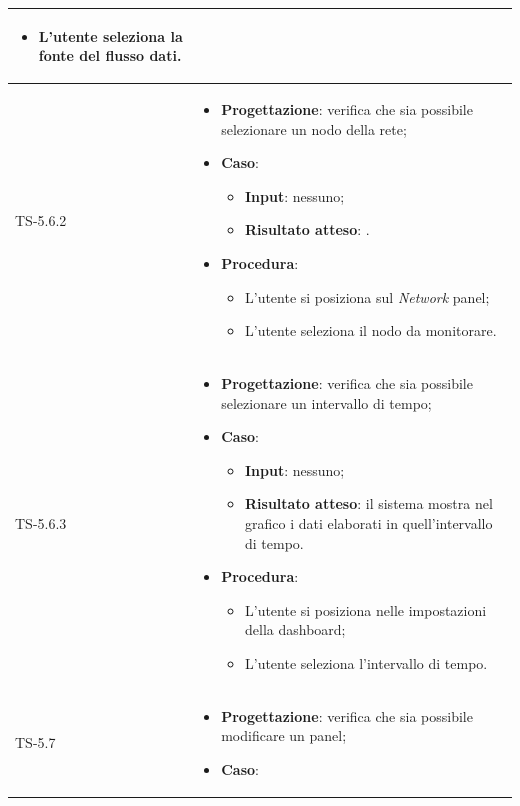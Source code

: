 \begin{longtable}{|C{2.5cm}|C{13cm}|}
\begin{itemize}
\begin{itemize}
		\item L'utente seleziona la fonte del flusso dati.
	\end{itemize} 
\end{itemize}
	 \\
	\hline
	{TS-5.6.2} & 
\begin{itemize}
	\item \textbf{Progettazione}: verifica che sia possibile selezionare un
	nodo della rete;
	\item \textbf{Caso}: 
	\begin{itemize}
		\item \textbf{Input}: nessuno;
		\item \textbf{Risultato atteso}: .
	\end{itemize}
	\item \textbf{Procedura}:
	\begin{itemize}
		\item L'utente si posiziona sul \emph{Network} panel;
		\item L'utente seleziona il nodo da monitorare.
	\end{itemize} 
\end{itemize}
	 \\
	\hline
	{TS-5.6.3} & 
\begin{itemize}
	\item \textbf{Progettazione}: verifica che sia possibile selezionare un
	intervallo di tempo;
	\item \textbf{Caso}: 
	\begin{itemize}
		\item \textbf{Input}: nessuno;
		\item \textbf{Risultato atteso}: il sistema mostra nel grafico i dati elaborati in quell'intervallo di tempo.
	\end{itemize}
	\item \textbf{Procedura}:
	\begin{itemize}
		\item L'utente si posiziona nelle impostazioni della dashboard;
		\item L'utente seleziona l'intervallo di tempo.
	\end{itemize} 
\end{itemize}
	 \\
	\hline
	{TS-5.7} & 
\begin{itemize}
	\item \textbf{Progettazione}: verifica che sia possibile modificare un
	panel;
	\item \textbf{Caso}: 
	\begin{itemize}

\end{itemize}
\end{itemize}
\end{longtable}
